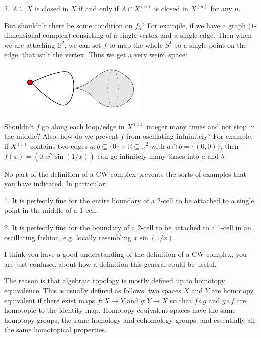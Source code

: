 3. $A\subseteq X$ is closed in $X$ if and only if $A\cap X^{(n)}$ is closed in $X^{(n)}$ for any $n$.

But shouldn't there be some condition on $f_\lambda$? For example, if we have a graph ($1$-dimensional complex) consisting of a single vertex and a single edge. Then when we are attaching $\mathbb{B}^2$, we can set $f$ to map the whole $S^1$ to a single point on the edge, that isn't the vertex. Thus we get a very weird space:
\begin{figure}[h!]
\centering
\includegraphics[width=6cm]{hulu.png}
\end{figure}

Shouldn't $f$ go along each loop/edge in $X^{(1)}$ integer many times and not stop in the middle? Also, how do we prevent $f$ from oscillating infninitely? For example, if $X^{(1)}$ contains two edges $a,b\subseteq\{0\}\times\mathbb{R}\subseteq\mathbb{R}^2$ with $a\cap b=\{(0,0)\}$, then $f(x)=(0,x^2\sin(1/x))$ can go infinitely many times into $a$ and $b$.\hfill || \par



No part of the definition of a CW complex prevents the sorts of examples that you have indicated.  In particular:

1. It is perfectly fine for the entire boundary of a 2-cell to be attached to a single point in the middle of a 1-cell.

2. It is perfectly fine for the boundary of a 2-cell to be attached to a 1-cell in an oscillating fashion, e.g. locally resembling $x \sin(1/x)$.\par

I think you have a good understanding of the definition of a CW complex, you are just confused about how a definition this general could be useful.\par

The reason is that algebraic topology is mostly defined up to homotopy equivalence. This is usually defined as follows: two spaces $X$ and $Y$ are homotopy equivalent if there exist maps $f\colon X\to Y$ and $g\colon Y \to X$ so that $f\circ g$ and $g\circ f$ are homotopic to the identity map.  Homotopy equivalent spaces have the same homotopy groups, the same homology and cohomology groups, and essentially all the same homotopical properties.\par

